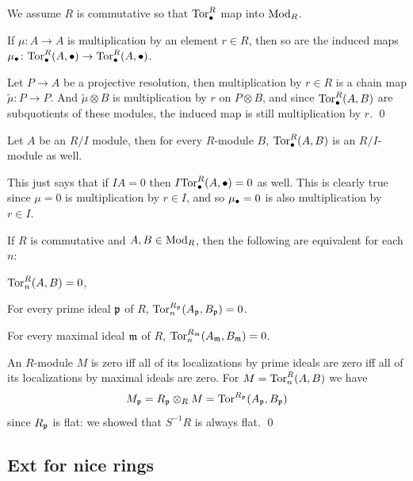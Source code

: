 \eproof

We assume $R$ is commutative so that ${\rm Tor}^R_\bullet$ map into ${\rm Mod}_R$.

\blemm

    If $\mu\colon A\to A$ is multiplication by an element $r\in R$, then so are the induced maps $\mu_\bullet\colon{\rm Tor}^R_\bullet(A,\bullet)\to{\rm Tor}^R_\bullet(A,\bullet)$.

\elemm

\bproof

    Let $P\to A$ be a projective resolution, then multiplication by $r\in R$ is a chain map $\tilde\mu\colon P\to P$.
    And $\tilde\mu\otimes B$ is multiplication by $r$ on $P\otimes B$, and since ${\rm Tor}^R_\bullet(A,B)$ are subquotients of these modules, the induced map is still multiplication by $r$.
    \qed

\eproof

\bcoro

    Let $A$ be an $R/I$ module, then for every $R$-module $B$, ${\rm Tor}^R_\bullet(A,B)$ is an $R/I$-module as well.

\ecoro

This just says that if $IA=0$ then $I{\rm Tor}^R_\bullet(A,\bullet)=0$ as well.
This is clearly true since $\mu=0$ is multiplication by $r\in I$, and so $\mu_\bullet=0$ is also multiplication by $r\in I$.

\bcoro[title=Localization for Tor]

    If $R$ is commutative and $A,B\in{\rm Mod}_R$, then the following are equivalent for each $n$:
    \benum
        \item ${\rm Tor}^R_n(A,B)=0$,
        \item For every prime ideal ${{\frak p}}$ of $R$, ${\rm Tor}^{R_{{\frak p}}}_n(A_{{\frak p}},B_{{\frak p}})=0$.
        \item For every maximal ideal ${{\frak m}}$ of $R$, ${\rm Tor}^{R_{{\frak m}}}_n(A_{{\frak m}},B_{{\frak m}})=0$.
    \eenum

\ecoro

\bproof

    An $R$-module $M$ is zero iff all of its localizations by prime ideals are zero iff all of its localizations by maximal ideals are zero.
    For $M={\rm Tor}^R_n(A,B)$ we have
    $$ M_{{\frak p}} = R_{{\frak p}}\otimes_RM = {\rm Tor}^{R_{{\frak p}}}(A_{{\frak p}},B_{{\frak p}}) $$
    since $R_{{\frak p}}$ is flat: we showed that $S^{-1}R$ is always flat.
    \qed

\eproof

\subsection{Ext for nice rings}

